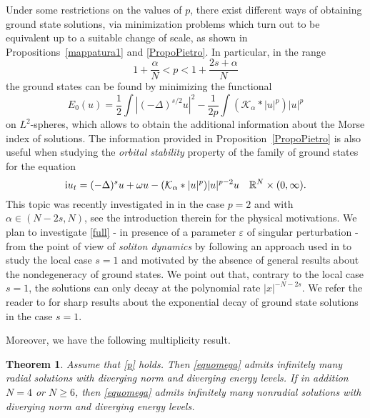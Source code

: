 \documentclass[10pt]{amsart}
\numberwithin{equation}{section}
\newtheorem{theorem}{Theorem}[section]
\begin{document}
\noindent
Under some restrictions on the values of $p$, there exist different ways of
obtaining ground state solutions, via minimization problems 
which turn out to be equivalent up to a suitable change of scale,
as shown in Propositions~\ref{mappatura1} and \ref{PropoPietro}.
In particular, in the range
\begin{equation}
\label{p2}
1+\frac{\alpha}{N}<p<1+\frac{2s+\alpha}{N}
\end{equation}
the ground states can be found by minimizing the functional 
\begin{equation}
\label{defE0}
E_0(u)=\frac{1}{2}\int |(-\Delta)^{s/2}u|^{2} -\frac{1}{2p}\int {{(\mathcal K_{\alpha}*|u|^{p})}} |u|^{p}
\end{equation}
on $L^2$-spheres, which allows to obtain
the additional information about the Morse index of solutions.
The information provided in Proposition~\ref{PropoPietro} is also useful
when studying the {\em orbital stability} property of the family of ground states for the equation 
\begin{equation}
\label{full} 
{\rm i}u_t={{(-\Delta)^{s}}} u+\omega u-{{(\mathcal K_{\alpha}*|u|^{p})}} |u|^{p-2}u\quad {{\mathbb R}}^N\times(0,\infty).
 \end{equation}
 This topic was recently investigated in \cite{Wu} in the case $p=2$ and with $\alpha\in (N-2s,N)$, 
 see the introduction therein for the physical motivations.  
 We plan to investigate \eqref{full} - in presence of a parameter ${\varepsilon}$ of singular perturbation - from the point of view of {\em soliton dynamics} 
 by following an approach used in \cite{pisani} to study the local case $s=1$ and motivated by the absence of general results
about the nondegeneracy of ground states.
\vskip3pt
\noindent
We point out that, contrary to the local case $s=1$, the solutions can only decay at the 
polynomial rate $|x|^{-N-2s}$. We refer the reader to \cite{MV} for sharp results about 
the exponential decay of ground state solutions in the case $s=1$.

\vskip5pt
\noindent
Moreover, we have the following multiplicity result.
\begin{theorem}
\label{multiplinto}
Assume that \eqref{p} holds. Then \eqref{equomega} admits infinitely many radial solutions
with diverging norm and diverging energy levels. If in addition $N=4$ or $N\geq 6$, then \eqref{equomega} 
admits infinitely many nonradial solutions with diverging norm and diverging energy levels.
\end{theorem}
\end{document}
